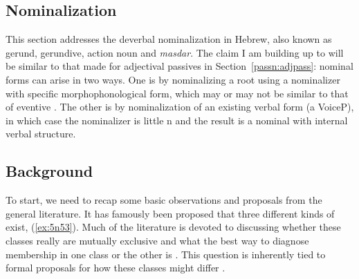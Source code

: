 \begin{exe}
\begin{xlist}
\begin{exe}
\begin{xlist}
\begin{exe}
\begin{exe}
\begin{xlist}
\begin{exe}
\begin{exe}
\begin{xlist}
\begin{exe}
\begin{xlist}
\begin{exe}
\begin{xlist}
\begin{exe}
\begin{xlist}
\begin{exe}
\begin{xlist}
\begin{xlist}
\begin{exe}
\begin{xlist}
\begin{exe}
\begin{xlist}
\begin{exe}
\begin{exe}
\begin{exe}
\begin{xlist}
\begin{exe}
\begin{exe}
\begin{xlist}
\begin{exe}
\begin{xlist}
\begin{exe}
\begin{xlist}
\begin{exe}
\begin{xlist}
\begin{xlist}
\begin{exe}
\begin{xlist}
\begin{exe}
\begin{xlist}
\begin{exe}
\begin{xlist}
\begin{exe}
\begin{xlist}
\begin{exe}
\begin{exe}
\begin{exe}
\begin{exe}
\begin{exe}
\begin{xlist}
\begin{xlist}
\begin{exe}
\begin{xlist}
\begin{exe}
\begin{xlist}
\begin{exe}
\begin{exe}
\begin{exe}
\begin{xlist}
\begin{exe}
\begin{xlist}
\begin{exe}
\begin{xlist}
\begin{exe}
\section{Nominalization} \label{passn:n}
This section addresses the deverbal nominalization in Hebrew, also known as gerund, gerundive, action noun and \emph{masdar}. The claim I am building up to will be similar to that made for adjectival passives in Section~\ref{passn:adjpass}: nominal forms can arise in two ways. One is by nominalizing a root using a nominalizer with specific morphophonological form, which may or may not be similar to that of eventive . The other is by nominalization of an existing verbal form (a VoiceP), in which case the nominalizer is little n and the result is a nominal with internal verbal structure.

	\subsection{Background}
To start, we need to recap some basic observations and proposals from the general literature. It has famously been proposed \citep{grimshaw90} that three different kinds of \textsc{} exist, (\ref{ex:5n53}). Much of the literature is devoted to discussing whether these classes really are mutually exclusive and what the best way to diagnose membership in one class or the other is \citep{alexiadou01,alexiadou09,alexiadou10b,alexiadou17,borer13oup,borer14lingua}. This question is inherently tied to formal proposals for how these classes might differ \citep{chomsky70,marantz97,harley09n,bruening13,wood19lsa}.


\end{exe}
\end{xlist}
\end{exe}
\end{xlist}
\end{exe}
\end{xlist}
\end{exe}
\end{exe}
\end{exe}
\end{xlist}
\end{exe}
\end{xlist}
\end{exe}
\end{xlist}
\end{xlist}
\end{exe}
\end{exe}
\end{exe}
\end{exe}
\end{exe}
\end{xlist}
\end{exe}
\end{xlist}
\end{exe}
\end{xlist}
\end{exe}
\end{xlist}
\end{exe}
\end{xlist}
\end{xlist}
\end{exe}
\end{xlist}
\end{exe}
\end{xlist}
\end{exe}
\end{xlist}
\end{exe}
\end{exe}
\end{xlist}
\end{exe}
\end{exe}
\end{exe}
\end{xlist}
\end{exe}
\end{xlist}
\end{exe}
\end{xlist}
\end{xlist}
\end{exe}
\end{xlist}
\end{exe}
\end{xlist}
\end{exe}
\end{xlist}
\end{exe}
\end{xlist}
\end{exe}
\end{exe}
\end{xlist}
\end{exe}
\end{exe}
\end{xlist}
\end{exe}
\end{xlist}
\end{exe}
